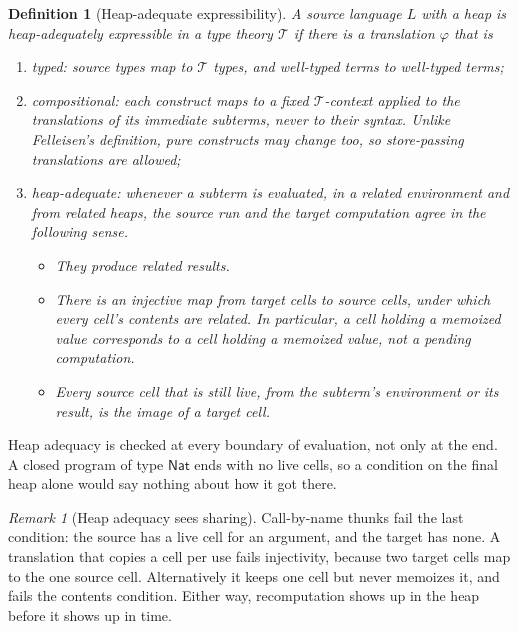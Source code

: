 \documentclass[11pt]{article}
\newtheorem{definition}{Definition}
\theoremstyle{remark}
\newtheorem*{remark}{Remark}
\newcommand{\Nat}{\mathsf{Nat}}
\begin{document}
\begin{definition}[Heap-adequate expressibility]
  A source language $L$ with a heap is \emph{heap-adequately
  expressible} in a type theory $\mathcal{T}$ if there is a
  translation $\varphi$ that is
  \begin{enumerate}
    \item \emph{typed}: source types map to $\mathcal{T}$ types, and
      well-typed terms to well-typed terms;
    \item \emph{compositional}: each construct maps to a fixed
      $\mathcal{T}$-context applied to the translations of its immediate
      subterms, never to their syntax. Unlike Felleisen's definition, pure
      constructs may change too, so store-passing translations are allowed;
    \item \emph{heap-adequate}: whenever a subterm is evaluated, in a
      related environment and from related heaps, the source run and the
      target computation agree in the following sense.
      \begin{itemize}
        \item They produce related results.
        \item There is an injective map from target cells to source cells,
          under which every cell's contents are related. In particular, a
          cell holding a memoized value corresponds to a cell holding a
          memoized value, not a pending computation.
        \item Every source cell that is still live, from the subterm's
          environment or its result, is the image of a target cell.
      \end{itemize}
  \end{enumerate}
\end{definition}

Heap adequacy is checked at every boundary of evaluation, not only at the
end. A closed program of type $\Nat$ ends with no live cells, so a condition
on the final heap alone would say nothing about how it got there.

\begin{remark}[Heap adequacy sees sharing]
  Call-by-name thunks fail the last condition: the source has a live cell
  for an argument, and the target has none. A translation that copies a cell
  per use fails injectivity, because two target cells map to the one source
  cell. Alternatively it keeps one cell but never memoizes it, and fails the
  contents condition. Either way, recomputation shows up in the heap before
  it shows up in time.
\end{remark}
\end{document}
